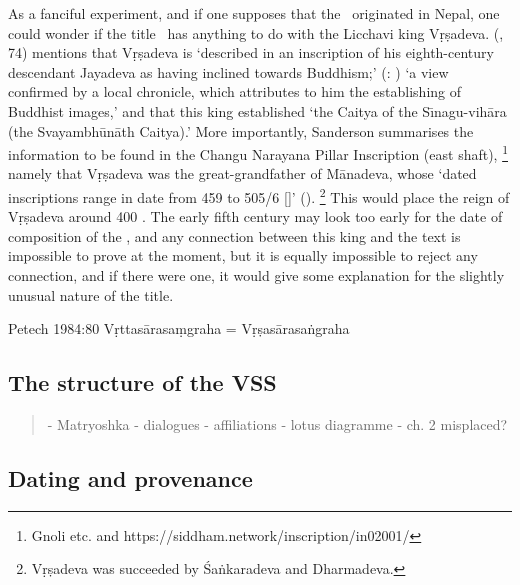 \documentclass[11pt]{book}
\begin{document}
As a fanciful experiment, and if one supposes that the 
\VSS\ originated in Nepal, one could wonder if the 
title \Vss\ has anything to do with the Licchavi king
Vṛṣadeva.
\citeauthor{SandersonSaivaAge} 
(\citeyear{SandersonSaivaAge}, 74) mentions that  
Vṛṣadeva is `described in an inscription of his eighth-century 
descendant Jayadeva as having inclined towards Buddhism;'
(: 
) 
`a view conﬁrmed by a local chronicle, which attributes to
him the establishing of Buddhist images,'
and that this king established 
`the Caitya of the Sı̄nagu-vihāra (the Svayambhūnāth Caitya).'
More importantly, Sanderson summarises the 
information to be found in the 
Changu Narayana Pillar Inscription (east shaft),%
		\footnote{Gnoli etc. and 
		https://siddham.network/inscription/in02001/} 
namely that Vṛṣadeva was the great-grandfather of Mānadeva, whose
`dated inscriptions range in date from 459 to 505/6 [\CE]'
().%
	   \footnote{Vṛṣadeva was succeeded by Śaṅkaradeva and
	   		            Dharmadeva.}
This would place 
the reign of Vṛṣadeva around 400 \CE. 
The early fifth century may look too early for the date of composition
of the \Vss, and any connection between this king
and the text is impossible to prove at the moment, 
but it is equally impossible to reject any connection, 
and if there were one, it would give some explanation for the slightly
unusual nature of the title.
\hide{
}

Petech 1984:80 Vṛttasārasaṃgraha = Vṛṣasārasaṅgraha

\subsection{The structure of the VSS}

\begin{quote}
- Matryoshka 
- dialogues
- affiliations
- lotus diagramme
- ch. 2 misplaced? 
\end{quote}

\vfill
\pagebreak




\subsection{Dating and provenance}
\end{document}
